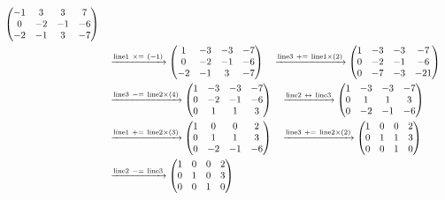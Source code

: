 \documentclass{ltjsarticle}
\begin{document}
\begin{align*}
 \begin{pmatrix}
 -1 & 3 & 3 & 7\\
 0 & - 2 & -1 & - 6\\
 - 2 & -1 & 3 & - 7
\end{pmatrix}\allowdisplaybreaks\\
&\ \ \ \xrightarrow{ \text{line} 1 \ \times=\ \left( - 1 \right)} %
\begin{pmatrix}
 1 & - 3 & - 3 & - 7\\
 0 & - 2 & -1 & - 6\\
 - 2 & -1 & 3 & - 7
\end{pmatrix}\ \ \ \xrightarrow{ \text{line} 3 \ +=\  \text{line} 1 \times\left( 2 \right)} %
\begin{pmatrix}
 1 & - 3 & - 3 & - 7\\
 0 & - 2 & -1 & - 6\\
 0 & - 7 & - 3 & - 21
\end{pmatrix}\allowdisplaybreaks\\
 &\ \ \ \xrightarrow{ \text{line} 3 \ -=\  \text{line} 2 \times\left( 4 \right)} %
\begin{pmatrix}
 1 & - 3 & - 3 & - 7\\
 0 & - 2 & -1 & - 6\\
 0 & 1 & 1 & 3
\end{pmatrix}\ \ \ \xrightarrow{ \text{line} 2 \ \leftrightarrow\  \text{line} 3 } %
\begin{pmatrix}
 1 & - 3 & - 3 & - 7\\
 0 & 1 & 1 & 3\\
 0 & - 2 & -1 & - 6
\end{pmatrix}\allowdisplaybreaks\\
 &\ \ \ \xrightarrow{ \text{line} 1 \ +=\  \text{line} 2 \times\left( 3 \right)} %
\begin{pmatrix}
 1 & 0 & 0 & 2\\
 0 & 1 & 1 & 3\\
 0 & - 2 & -1 & - 6
\end{pmatrix}\ \ \ \xrightarrow{ \text{line} 3 \ +=\  \text{line} 2 \times\left( 2 \right)} %
\begin{pmatrix}
 1 & 0 & 0 & 2\\
 0 & 1 & 1 & 3\\
 0 & 0 & 1 & 0
\end{pmatrix}\allowdisplaybreaks\\
 &\ \ \ \xrightarrow{ \text{line} 2 \ -=\  \text{line} 3 } %
\begin{pmatrix}
 1 & 0 & 0 & 2\\
 0 & 1 & 0 & 3\\
 0 & 0 & 1 & 0
\end{pmatrix}
\end{align*}
\end{document}
